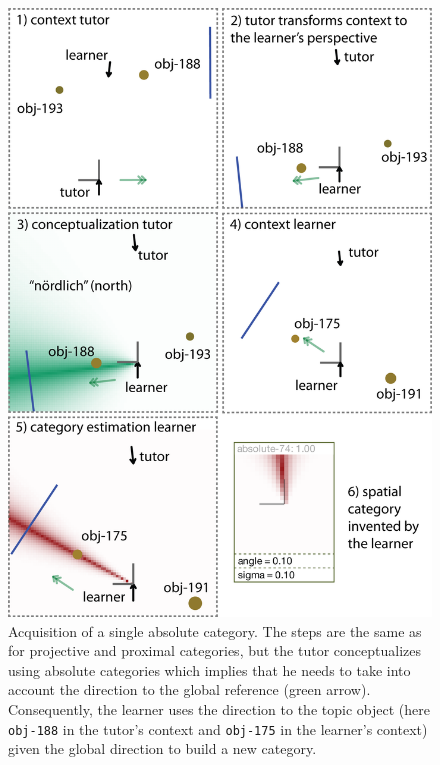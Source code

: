 \begin{figure}
\begin{center}
\includegraphics[width=0.8\columnwidth]{figs/category-acquisition-absolute-single-category-acquisition.png}
\end{center}
\caption[Acquisition of a single absolute category]{
Acquisition of a single absolute category. The steps are the 
same as for projective and proximal categories, but the tutor 
conceptualizes using absolute categories which
implies that he needs to take into account the direction to 
the global reference (green arrow).
Consequently, the learner uses the direction to the topic object 
(here {\footnotesize\tt obj-188} in the tutor's context and {\footnotesize\tt obj-175} in the learner's context)
given the global direction to build a new category.}
\label{f:category-acquisition-absolute-single-acquisition}
\end{figure}


